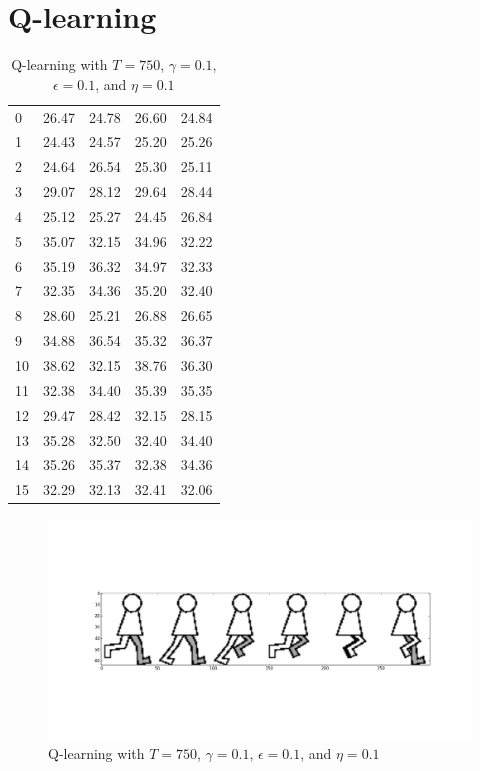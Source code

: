 \documentclass[a4paper]{article}
\begin{document}
\section{Q-learning}
\begin{table}[h!]
\centering
\begin{tabular}{l|l|l|l|l}
    0 & 26.47 & 24.78 & 26.60 & 24.84 \\
    1 & 24.43 & 24.57 & 25.20 & 25.26 \\
    2 & 24.64 & 26.54 & 25.30 & 25.11 \\
    3 & 29.07 & 28.12 & 29.64 & 28.44 \\
    4 & 25.12 & 25.27 & 24.45 & 26.84 \\
    5 & 35.07 & 32.15 & 34.96 & 32.22 \\
    6 & 35.19 & 36.32 & 34.97 & 32.33 \\
    7 & 32.35 & 34.36 & 35.20 & 32.40 \\
    8 & 28.60 & 25.21 & 26.88 & 26.65 \\
    9 & 34.88 & 36.54 & 35.32 & 36.37 \\
    10 & 38.62 & 32.15 & 38.76 & 36.30 \\
    11 & 32.38 & 34.40 & 35.39 & 35.35 \\
    12 & 29.47 & 28.42 & 32.15 & 28.15 \\
    13 & 35.28 & 32.50 & 32.40 & 34.40 \\
    14 & 35.26 & 35.37 & 32.38 & 34.36 \\
    15 & 32.29 & 32.13 & 32.41 & 32.06 \\
\end{tabular}
\caption{Q-learning with $T = 750$, $\gamma = 0.1$, $\epsilon = 0.1$, and $\eta = 0.1$}
\end{table}
\begin{figure}[h!]
    \centering
    \includegraphics[width=1\textwidth]{qlearning2.png}
    \caption{Q-learning with $T = 750$, $\gamma = 0.1$, $\epsilon = 0.1$, and $\eta = 0.1$}
\end{figure}
\end{document}
